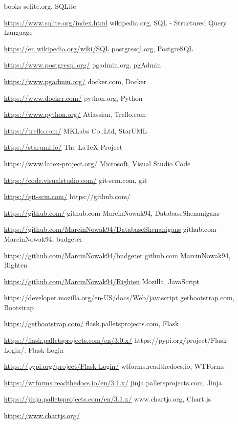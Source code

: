 \documentclass[a4paper,10pt, twoside]{report}
\begin{document}
\begin{large}
\begin{thebibliography} {books}
     sqlite.org, SQLite \raggedright\url{
        https://www.sqlite.org/index.html}
     wikipedia.org, SQL - Structured Query Language \raggedright\url{
        https://en.wikipedia.org/wiki/SQL}
     postgresql.org, PostgreSQL \raggedright\url{
        https://www.postgresql.org/}
     pgadmin.org, pgAdmin \raggedright\url{
        https://www.pgadmin.org/}
     docker.com, Docker \raggedright\url{
        https://www.docker.com/}
     python.org, Python \raggedright\url{
        https://www.python.org/}
     Atlassian, Trello.com \raggedright\url{
        https://trello.com/}
     MKLabs Co.,Ltd, StarUML \raggedright\url{
        https://staruml.io/}
     The LaTeX Project \raggedright\url{
        https://www.latex-project.org/}
     Microsoft, Visual Studio Code \raggedright\url{
        https://code.visualstudio.com/}
     git-scm.com, git \raggedright\url{
        https://git-scm.com/}
     https://github.com/ \raggedright\url{
        https://github.com/}
     github.com MarcinNowak94, DatabaseShenanigans \raggedright\url{
        https://github.com/MarcinNowak94/DatabaseShenanigans}
     github.com MarcinNowak94, budgeter \raggedright\url{
        https://github.com/MarcinNowak94/budgeter}
     github.com MarcinNowak94, Righten \raggedright\url{
        https://github.com/MarcinNowak94/Righten}
     Mozilla, JavaScript \raggedright\url{
        https://developer.mozilla.org/en-US/docs/Web/javascript}
     getbootstrap.com, Bootstrap \raggedright\url{
        https://getbootstrap.com/}
     flask.palletsprojects.com, Flask \raggedright\url{
        https://flask.palletsprojects.com/en/3.0.x/}
     https://pypi.org/project/Flask-Login/, Flask-Login \raggedright\url{
        https://pypi.org/project/Flask-Login/}
     wtforms.readthedocs.io, WTForms \raggedright\url{
        https://wtforms.readthedocs.io/en/3.1.x/}
     jinja.palletsprojects.com, Jinja \raggedright\url{
        https://jinja.palletsprojects.com/en/3.1.x/}
     www.chartjs.org, Chart.js \raggedright\url{
        https://www.chartjs.org/}
\end{thebibliography}

\listoffigures
\listoftables
\lstlistoflistings

\end{large}
\end{document}

